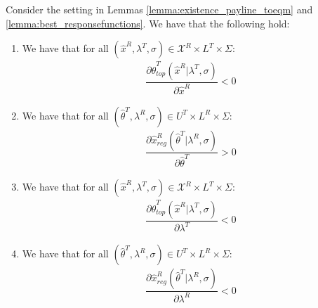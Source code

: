 \begin{lemma}
Consider the setting in Lemmas \ref{lemma:existence_payline_toeqm} and \ref{lemma:best_responsefunctions}. We have that the following hold:
\vspace{-5pt}
\begin{enumerate}[label=(\arabic*),ref=\thelemma(\arabic*)]
   \item\label{lemma:xR_thetaT} We have that for all $(\hat{x}^R,\lambda^T,\sigma)\in \mathcal{X}^R\times L^T\times \Sigma$:
   \begin{align*}
      \dfrac{\partial \hat{\theta}^T_{top}(\hat{x}^R|\lambda^T,\sigma)}{\partial \hat{x}^R} < 0
   \end{align*}
   \item\label{lemma:thetaT_xR} We have that for all $(\hat{\theta}^T,\lambda^R,\sigma)\in U^T\times L^R\times \Sigma$:
   \begin{align*}
      \dfrac{\partial \hat{x}^R_{reg}(\hat{\theta}^T|\lambda^R,\sigma)}{\partial \hat{\theta}^T} > 0
   \end{align*}
   \item\label{lemma:lbdaT_thetaT} We have that for all $(\hat{x}^R,\lambda^T,\sigma)\in \mathcal{X}^R\times L^T\times \Sigma$:
   \begin{align*}
      \dfrac{\partial \hat{\theta}^T_{top}(\hat{x}^R|\lambda^T,\sigma)}{\partial \lambda^T} < 0
   \end{align*}
   \item\label{lemma:lbdaR_xR} We have that for all $(\hat{\theta}^T,\lambda^R,\sigma)\in U^T\times L^R\times \Sigma$:
   \begin{align*}
      \dfrac{\partial \hat{x}^R_{reg}(\hat{\theta}^T|\lambda^R,\sigma)}{\partial \lambda^R} < 0
   \end{align*}
\end{enumerate}
\end{lemma}

